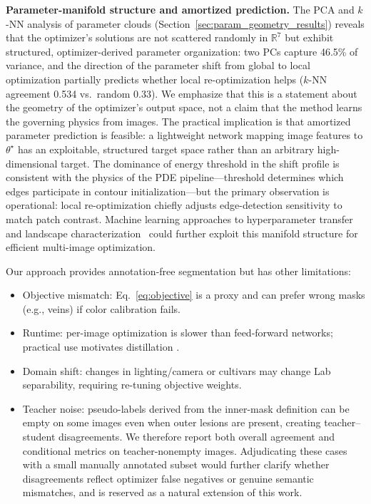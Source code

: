 \documentclass[11pt,a4paper]{article}
\newcommand{\R}{\mathbb{R}}
\begin{document}
\textbf{Parameter-manifold structure and amortized prediction.}
The PCA and $k$-NN analysis of parameter clouds (Section~\ref{sec:param_geometry_results}) reveals that the optimizer's solutions are not scattered randomly in $\R^7$ but exhibit structured, optimizer-derived parameter organization: two PCs capture 46.5\% of variance, and the direction of the parameter shift from global to local optimization partially predicts whether local re-optimization helps ($k$-NN agreement 0.534 vs.\ random 0.33). We emphasize that this is a statement about the geometry of the optimizer's output space, not a claim that the method learns the governing physics from images. The practical implication is that amortized parameter prediction is feasible: a lightweight network mapping image features to $\theta^\star$ has an exploitable, structured target space rather than an arbitrary high-dimensional target. The dominance of energy threshold in the shift profile is consistent with the physics of the PDE pipeline---threshold determines which edges participate in contour initialization---but the primary observation is operational: local re-optimization chiefly adjusts edge-detection sensitivity to match patch contrast. Machine learning approaches to hyperparameter transfer and landscape characterization~\citep{yu2020hyperparam,singh2016machine} could further exploit this manifold structure for efficient multi-image optimization.

Our approach provides annotation-free segmentation but has other limitations:
\begin{itemize}
    \item Objective mismatch: Eq.~\eqref{eq:objective} is a proxy and can prefer wrong masks (e.g., veins) if color calibration fails.
    \item Runtime: per-image optimization is slower than feed-forward networks; practical use motivates distillation \citep{hinton2015distilling}.
    \item Domain shift: changes in lighting/camera or cultivars may change Lab separability, requiring re-tuning objective weights.
    \item Teacher noise: pseudo-labels derived from the inner-mask definition can be empty on some images even when outer lesions are present, creating teacher--student disagreements. We therefore report both overall agreement and conditional metrics on teacher-nonempty images. Adjudicating these cases with a small manually annotated subset would further clarify whether disagreements reflect optimizer false negatives or genuine semantic mismatches, and is reserved as a natural extension of this work.
\end{itemize}
\end{document}
